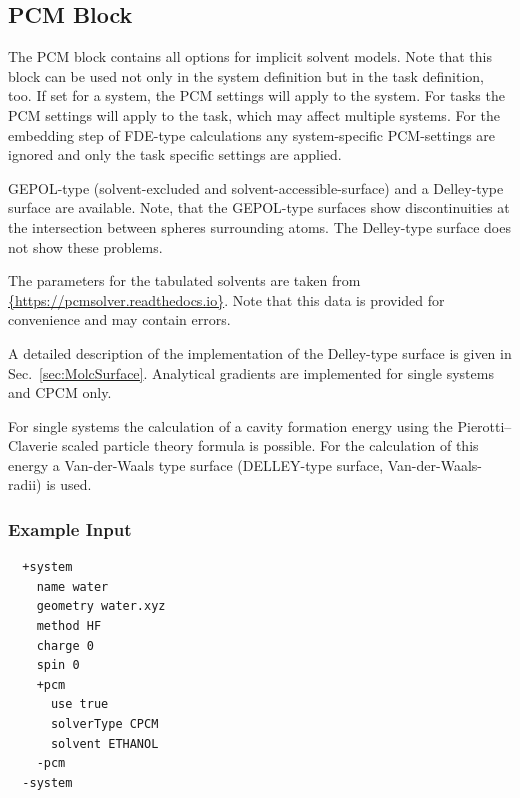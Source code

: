 \documentclass[bibliography=totocnumbered,a4paper,10pt,oneside]{scrbook}
\begin{document}
\subsection{PCM Block}\label{sec:system:pcm}

The PCM block contains all options for implicit solvent models. Note that this block can
be used not only in the system definition but in the task definition, too. If set for
a system, the PCM settings will apply to the system. For tasks the PCM settings will apply
to the task, which may affect multiple systems. For the embedding step of FDE-type
calculations any system-specific PCM-settings are ignored and only the task specific settings
are applied.

GEPOL-type\cite{Pascual-Ahuir1987} (solvent-excluded and solvent-accessible-surface) and
a Delley-type\cite{Delley2006} surface are available. Note, that the GEPOL-type surfaces
show discontinuities at the intersection between spheres surrounding atoms. The Delley-type
surface does not show these problems.

The parameters for the tabulated solvents are taken from
\url{{https://pcmsolver.readthedocs.io}}.
Note that this data is provided for convenience and may contain errors.

A detailed description of the implementation of the Delley-type surface is given in Sec.~\ref{sec:MolcSurface}.
Analytical gradients are implemented for single systems and CPCM only.

For single systems the calculation of a cavity formation energy using the Pierotti--Claverie scaled particle
theory formula\cite{langlet1988improvements} is possible. For the calculation of this energy a Van-der-Waals
type surface (DELLEY-type surface, Van-der-Waals-radii) is used.


\subsubsection{Example Input}
\begin{lstlisting}
  +system
    name water  
    geometry water.xyz
    method HF  
    charge 0
    spin 0
    +pcm 
      use true
      solverType CPCM 
      solvent ETHANOL
    -pcm 
  -system
 \end{lstlisting}
\end{document}
